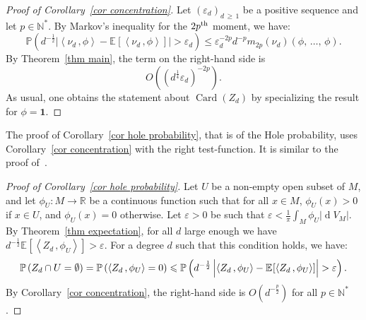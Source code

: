 \documentclass[AHL,Unicode,longabstracts,published]{cedram}
\DeclareMathOperator{\card}{Card}
\DeclareMathOperator{\dmesure}{d}
\newcommand{\N}{\mathbb{N}}
\newcommand{\R}{\mathbb{R}}
\renewcommand{\P}{\mathbb{P}}
\newcommand{\bfun}{\mathbf{1}}
\newcommand{\esp}[2][]{\mathbb{E}_{#1}\!\left[#2 \right]}
\newcommand{\norm}[1]{\left\lvert #1 \right\rvert}
\newcommand{\prsc}[2]{\left\langle #1\,, #2 \right\rangle}
\newcommand{\rmes}[1]{\norm{\dmesure\! V_{#1}}}
\renewcommand{\epsilon}{\varepsilon}
\renewcommand{\geq}{\geqslant}
\renewcommand{\leq}{\leqslant}
\begin{document}
\begin{proof}[Proof of Corollary~\ref{cor concentration}]
Let $(\epsilon_d)_{d\,\geq\,1}$ be a positive sequence and let $p \in \N^*$. By Markov's inequality for the $2p^{\rm th}$ moment, we have:
\[
\P\left(d^{-\frac{1}{2}}\norm{\prsc{\nu_d}{\phi} - \esp{\prsc{\nu_d}{\phi}}} > \epsilon_d \right) \leq \epsilon_d^{-2p} d^{-p} m_{2p}(\nu_d)(\phi,\,\dots,\,\phi).
\]
By Theorem~\ref{thm main}, the term on the right-hand side is
\[O\!\left((d^\frac{1}{4}\epsilon_d)^{-2p}\right).
\]
As usual, one obtains the statement about $\card(Z_d)$ by specializing the result for $\phi = \bfun$.
\end{proof}

The proof of Corollary~\ref{cor hole probability}, that is of the Hole probability, uses Corollary~\ref{cor concentration} with the right test-function. It is similar to the proof of~\cite[Corollary~1.10]{Let2019}.

\begin{proof}[{Proof of Corollary~\ref{cor hole probability}}]
Let $U$ be a non-empty open subset of $M$, and let $\phi_U:M \to \R$ be a continuous function such that for all $x \in M$, $\phi_U(x)>0$ if $x \in U$, and $\phi_U(x)=0$ otherwise. Let $\epsilon >0$ be such that $\epsilon < \tfrac{1}{\pi} \int_M \phi_U \rmes{M}$. By Theorem~\ref{thm expectation}, for all $d$ large enough we have $d^{-\frac{1}{2}}\esp{\prsc{Z_d}{\phi_U}} > \epsilon$. For a degree $d$ such that this condition holds, we have:
\[
\P\left(Z_d \cap U = \emptyset\right) = \P\left(\prsc{Z_d}{\phi_U} = 0\right) \leq \P\left(d^{-\frac{1}{2}}\norm{\prsc{Z_d}{\phi_U}-\rule{0pt}{10pt}\esp{\prsc{Z_d}{\phi_U}}}> \epsilon\right).
\]
By Corollary~\ref{cor concentration}, the right-hand side is $O(d^{-\frac{p}{2}})$ for all $p \in \N^*$.
\end{proof}




\end{document}
